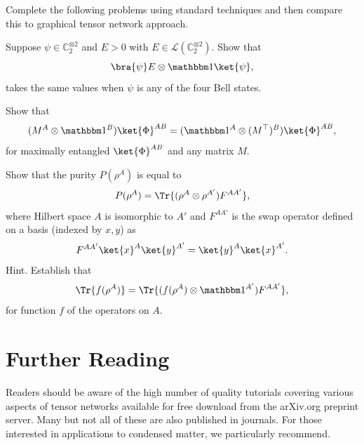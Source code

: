 \begin{remark}
Complete the following problems using standard techniques and then compare this to graphical tensor network approach. 
\end{remark}
\begin{myexercise}
Suppose $\psi \in \mathbb{C}_2^{\otimes 2}$ and $E>0$ with $E\in \mathcal{L}(\mathbb{C}_2^{\otimes 2})$. Show that 
\begin{equation}
    \bra{\psi}E\otimes \I \ket{\psi}, 
\end{equation}
takes the same values when $\psi$ is any of the four Bell states.
\end{myexercise}

\begin{myexercise}
Show that 
\begin{equation}
(M^A\otimes \I^B)\ket{\Phi}^{AB} = (\I^A \otimes (M^\top)^B)\ket{\Phi}^{AB},
\end{equation}
for maximally entangled $\ket{\Phi}^{AB}$ and any matrix $M$. 
\end{myexercise}


\begin{myexercise}
Show that the purity $P(\rho^A)$ is equal to 
\begin{equation}
    P(\rho^A) = \Tr\{ (\rho^A\otimes \rho^{A'}) F^{AA'}\},
\end{equation}
where Hilbert space $A$ is isomorphic to $A'$ and $F^{AA'}$ is the swap operator defined on a basis (indexed by $x,y$) as 
\begin{equation}
    F^{AA'}\ket{x}^A\ket{y}^{A'}=\ket{y}^A\ket{x}^{A'}.
\end{equation}
Hint. Establish that 
\begin{equation}
    \Tr\{f(\rho^A)\}= \Tr\{(f(\rho^A)\otimes \I^{A'} )F^{AA'}\},
\end{equation}
for function $f$ of the operators on $A$. 
\end{myexercise}

\section{Further Reading}

Readers should be aware of the high number of quality tutorials covering various aspects of tensor networks available for free download from the arXiv.org preprint server.  Many but not all of these are also published in journals. For those interested in applications to condensed matter, we particularly recommend. \\

